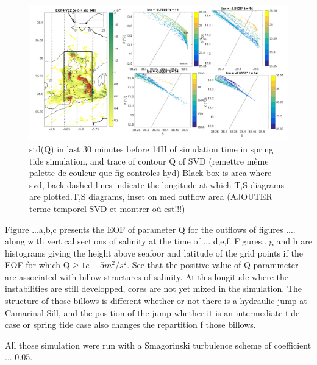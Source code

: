 \begin{figure}[!h]
 \includegraphics[width=\textwidth]{./GBR3D/TS_coupes_14H_VE2o.png}
 \caption {std(Q) in last 30 minutes before 14H of simulation time in spring tide simulation, and trace of contour Q of SVD (remettre même palette de couleur que fig controles hyd) Black box is area where svd, back dashed lines indicate the longitude at which T,S diagrams are plotted.T,S diagrams, inset on med outflow area (AJOUTER terme temporel SVD et montrer où est!!!)}
 \label{FigTSCS}
\end{figure}


Figure ...a,b,c presents the EOF of parameter Q for the outflows of figures .... along with vertical sections of salinity at the time of ... d,e,f. Figures.. g and h are histograms giving the height above seafoor and latitude of the grid points if the EOF for which Q$\geq 1e-5m^2/s^2$. See that the positive value of Q parammeter are associated with billow structures of salinity. At this longitude where the instabilities are still developped, cores are not yet mixed in the simulation. The structure of those billows is different whether or not there is a hydraulic jump at Camarinal Sill, and the position of the jump whether it is an intermediate tide case or spring tide case also changes the repartition f those billows.

All those simulation were run with a Smagorinski turbulence scheme of coefficient ... 0.05. 





